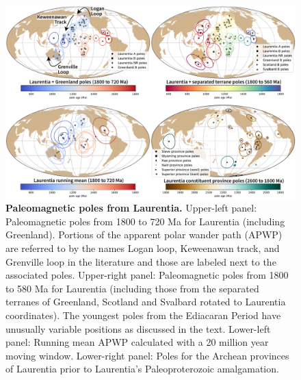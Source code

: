 \documentclass[twocolumn, switch]{article} %
\begin{document}
\begin{figure}[!h]
\centering
\includegraphics[width=\textwidth]{../Figures/Fig4_Laurentia_poles_combined.pdf}
\caption{\textbf{Paleomagnetic poles from Laurentia.} Upper-left panel: Paleomagnetic poles from 1800 to 720 Ma for Laurentia (including Greenland). Portions of the apparent polar wander path (APWP) are referred to by the names Logan loop, Keweenawan track, and Grenville loop in the literature and those are labeled next to the associated poles. Upper-right panel:  Paleomagnetic poles from 1800 to 580 Ma for Laurentia (including those from the separated terranes of Greenland, Scotland and Svalbard rotated to Laurentia coordinates). The youngest poles from the Ediacaran Period have unusually variable positions as discussed in the text. Lower-left panel: Running mean APWP calculated with a 20 million year moving window. Lower-right panel: Poles for the Archean provinces of Laurentia prior to Laurentia's Paleoproterozoic amalgamation.}
\label{fig:Laurentia_poles}
\end{figure}
\end{document}
